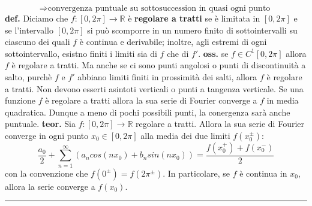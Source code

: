 \[
    \Rightarrow  \text{convergenza puntuale su sottosuccession in quasi ogni punto}\;
\]
\newline
\textbf{def.} Diciamo che $f : [0,2\pi] \rightarrow \mathbb{R}$ è \textbf{regolare a tratti} se è limitata in $[0,2\pi]$ e se l'intervallo $[0,2\pi]$ si può scomporre in un numero finito di sottointervalli su ciascuno dei quali $f$ è continua e derivabile; inoltre, agli estremi di ogni sottointervallo, esistno finiti i limiti sia di $f$ che di $f'$.\newline
\newline
\textbf{oss.} se $f \in C^1[0,2\pi]$ allora $f$ è regolare a tratti. Ma anche se ci sono punti angolosi o punti di discontinuità a salto, purchè $f$ e $f'$ abbiano limiti finiti in prossimità dei salti, allora $f$ è regolare a tratti. Non devono esserti asintoti verticali o punti a tangenza verticale.\newline
\newline
Se una funzione $f$ è regolare a tratti allora la sua serie di Fourier converge a $f$ in media quadratica. Dunque a meno di pochi possibili punti, la conergenza sarà anche puntuale.\newline
\newline
\textbf{teor.} Sia $f: [0,2\pi] \rightarrow \mathbb{R}$ regolare a tratti. Allora la sua serie di Fourier converge in ogni punto $x_0 \in [0,2\pi]$ alla media dei due limiti $f(x_0^{\pm})$:
\[
    \frac{a_0}{2} + \sum_{n=1}^{\infty} \left( a_n cos(nx_0) + b_n sin(nx_0) \right) = \frac{f(x_0^+) + f(x_0^-)}{2}
\]
con la convenzione che $f(0^\pm) = f(2\pi^\pm)$. In particolare, se $f$ è continua in $x_0$, allora la serie converge a $f(x_0)$.\newline
\rule{\textwidth}{0,4pt}
